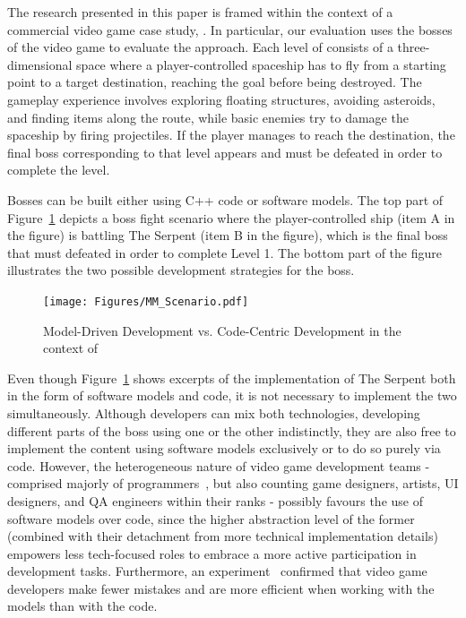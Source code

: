 The research presented in this paper is framed within the context of a commercial video game case study, \CaseStudy{}. In particular, our evaluation uses the bosses of the video game to evaluate the approach. Each level of \CaseStudy{} consists of a three-dimensional space where a player-controlled spaceship has to fly from a starting point to a target destination, reaching the goal before being destroyed. The gameplay experience involves exploring floating structures, avoiding asteroids, and finding items along the route, while basic enemies try to damage the spaceship by firing projectiles. If the player manages to reach the destination, the final boss corresponding to that level appears and must be defeated in order to complete the level. 

Bosses can be built either using C++ code or software models. The top part of Figure~\ref{fig:scenario} depicts a boss fight scenario where the player-controlled ship (item A in the figure) is battling The Serpent (item B in the figure), which is the final boss that must defeated in order to complete Level 1. The bottom part of the figure illustrates the two possible development strategies for the boss.

\begin{figure}[h]
    \centering
    \texttt{[image: Figures/MM\_Scenario.pdf]}
    \caption{Model-Driven Development vs. Code-Centric Development in the context of \CaseStudy{}}
    \label{fig:scenario}
\end{figure}

Even though Figure~\ref{fig:scenario} shows excerpts of the implementation of The Serpent both in the form of software models and code, it is not necessary to implement the two simultaneously. Although developers can mix both technologies, developing different parts of the boss using one or the other indistinctly, they are also free to implement the content using software models exclusively or to do so purely via code. However, the heterogeneous nature of video game development teams - comprised majorly of programmers~\cite{devNation}, but also counting game designers, artists, UI designers, and QA engineers within their ranks - possibly favours the use of software models over code, since the higher abstraction level of the former (combined with their detachment from more technical implementation details) empowers less tech-focused roles to embrace a more active participation in development tasks. Furthermore, an experiment~\cite{domingo2020evaluating} confirmed that video game developers make fewer mistakes and are more efficient when working with the models than with the code.

